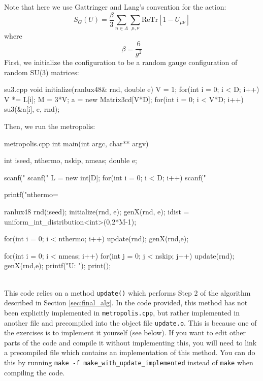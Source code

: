 \documentclass[11pt]{article}
\begin{document}
Note that here we use Gattringer and Lang's convention for the action:
\begin{equation}S_G(U)=\frac{\beta}{3}\sum_{n\in\Lambda}\sum_{\mu,\nu}\mathrm{ReTr}\left[1-U_{\mu\nu}\right]\end{equation}
where
\begin{equation}\beta=\frac{6}{g^2}\end{equation}
First, we initialize the configuration to be a random gauge configuration of random SU(3) matrices:

\begin{center}
\begin{minipage}{0.72\linewidth}
\begin{code}{su3.cpp}
void initialize(ranlux48& rnd, double e){
        V = 1;
        for(int i = 0; i < D; i++) V *= L[i];
        M = 3*V;
        a = new Matrix3cd[V*D];
        for(int i = 0; i < V*D; i++){
                su3(&a[i], e, rnd);
        }
} 
\end{code}
\end{minipage}
\end{center}

Then, we run the metropolis:\\

\begin{code}{metropolis.cpp}
int main(int argc, char** argv){
        int iseed, nthermo, nskip, nmeas;
        double e;

        scanf("%
        scanf("%
        L = new int[D];
        for(int i = 0; i < D; i++)
                scanf("%

        printf("nthermo=%

        ranlux48 rnd(iseed);
        initialize(rnd, e);
        genX(rnd, e);
        idist = uniform_int_distribution<int>(0,2*M-1);

        for(int i = 0; i < nthermo; i++){
                update(rnd);
                genX(rnd,e);
        }

        for(int i = 0; i < nmeas; i++){
                for(int j = 0; j < nskip; j++) update(rnd);
                genX(rnd,e);
                printf("U: "); print();
        }
}
\end{code}\\

This code relies on a method \lstinline{update()} which performs Step 2 of the algorithm described in Section \ref{sec:final_alg}. In the code provided, this method has not been explicitly implemented in \lstinline{metropolis.cpp}, but rather implemented in another file and precompiled into the object file \lstinline{update.o}. This is because one of the exercises is to implement it yourself (see below). If you want to edit other parts of the code and compile it without implementing this, you will need to link a precompiled file which contains an implementation of this method. You can do this by running \lstinline{make -f make_with_update_implemented} instead of \lstinline{make} when compiling the code. 
\end{document}
